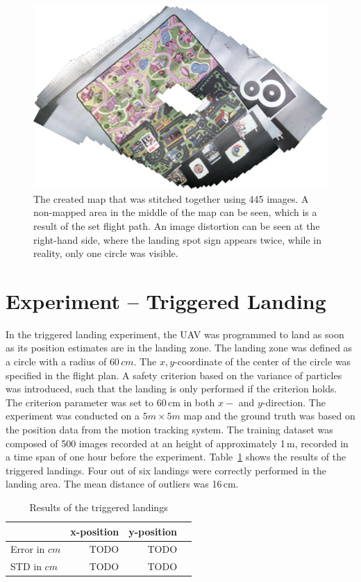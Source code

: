 \documentclass[11pt]{report}
\begin{document}
\begin{figure}[h!]
\begin{center}
\includegraphics[width=0.7\columnwidth]{map_rotated}
\caption{{\label{fig:mapexp} The created map that was stitched
    together using 445 images. A non-mapped area in the middle of the
    map can be seen, which is a result of the set flight path. An
    image distortion can be seen at the right-hand side, where the
    landing spot sign appears twice, while in reality, only one circle
    was visible.%
  }}
\end{center}
\end{figure}


\section{Experiment -- Triggered Landing}
\label{sec:triggered}

In the triggered landing experiment, the UAV was programmed to land as
soon as its position estimates are in the landing zone. The landing
zone was defined as a circle with a radius of $60\,cm$. The
$x,y$-coordinate of the center of the circle was specified in the
flight plan. A safety criterion based on the variance of particles was
introduced, such that the landing is only performed if the criterion
holds. The criterion parameter was set to 60\,cm in both $x-$ and
$y$-direction. The experiment was conducted on a $5m \times 5m$ map
and the ground truth was based on the position data from the motion
tracking system. The training dataset was composed of 500 images
recorded at an height of approximately 1\,m, recorded in a time span
of one hour before the experiment. Table~\ref{tab:targetlanding} shows
the results of the triggered landings. Four out of six landings were
correctly performed in the landing area. The mean distance of outliers
was 16\,cm.
\begin{table}[H]
  \centering
  \begin{tabular}{lrrr}
    \toprule
    & x-position & y-position\\
    \midrule
    Error in $cm$ & TODO & TODO\\
    STD in $cm$ & TODO & TODO\\
    \bottomrule
  \end{tabular}
  \caption[Triggered landings]{Results of the triggered landings}
  \label{tab:targetlanding}

\end{table}
\end{document}
